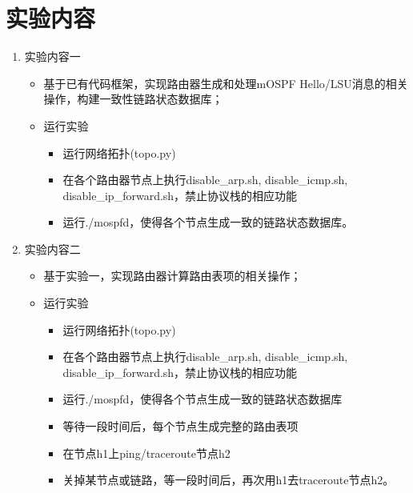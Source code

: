 \documentclass[UTF8]{report}
\begin{document}
\pagestyle{fancy}

\maketitle

\section{实验内容}

\begin{enumerate}
    \item 实验内容一
    \begin{itemize}
        \item 基于已有代码框架，实现路由器生成和处理mOSPF Hello/LSU消息的相关操作，构建一致性链路状态数据库；
        \item 运行实验
        \begin{itemize}
            \item 运行网络拓扑(topo.py)
            \item 在各个路由器节点上执行disable_arp.sh, disable_icmp.sh, disable_ip_forward.sh，禁止协议栈的相应功能
            \item 运行./mospfd，使得各个节点生成一致的链路状态数据库。
        \end{itemize}
    \end{itemize}
    \item 实验内容二
    \begin{itemize}
        \item 基于实验一，实现路由器计算路由表项的相关操作；
        \item 运行实验
        \begin{itemize}
            \item 运行网络拓扑(topo.py)
            \item 在各个路由器节点上执行disable_arp.sh, disable_icmp.sh, disable_ip_forward.sh，禁止协议栈的相应功能
            \item 运行./mospfd，使得各个节点生成一致的链路状态数据库
            \item 等待一段时间后，每个节点生成完整的路由表项
            \item 在节点h1上ping/traceroute节点h2
            \item 关掉某节点或链路，等一段时间后，再次用h1去traceroute节点h2。
        \end{itemize}
    \end{itemize}
\end{enumerate}
\end{document}
